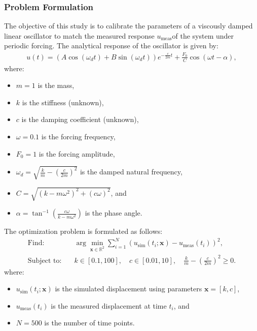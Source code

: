 \documentclass[12pt]{article}
\begin{document}
\subsubsection{Problem Formulation}
The objective of this study is to calibrate the parameters of a viscously damped linear oscillator to match the measured response $u_\text{meas}$of the system under periodic forcing. The analytical response of the oscillator is given by:
\begin{align*}
    u(t) = \left(A \cos(\omega_d t) + B \sin(\omega_d t)\right) e^{-\frac{c}{2m}t} + \frac{F_0}{C} \cos(\omega t - \alpha),
\end{align*}
where:
\begin{itemize}
    \item $m = 1$ is the mass,
    \item $k$ is the stiffness (unknown),
    \item $c$ is the damping coefficient (unknown),
    \item $\omega=0.1$ is the forcing frequency,
    \item $F_0=1$ is the forcing amplitude,
    \item $\omega_d = \sqrt{\frac{k}{m} - \left(\frac{c}{2m}\right)^2}$ is the damped natural frequency,
    \item $C = \sqrt{(k - m\omega^2)^2 + (c\omega)^2}$, and
    \item $\alpha = \tan^{-1}\left(\frac{c\omega}{k - m\omega^2}\right)$ is the phase angle.
\end{itemize}

The optimization problem is formulated as follows:
\begin{align*}
    \text{Find:} & \quad \arg \min_{\mathbf{x} \in \mathbb{R}^{2}}  \sum_{i=1}^N \left(u_{\text{sim}}(t_i; \mathbf{x}) - u_{\text{meas}}(t_i)\right)^2, \\
    \text{Subject to:} & \quad k \in [0.1, 100], \quad c \in [0.01, 10], \quad \frac{k}{m} - \left(\frac{c}{2m}\right)^2 \geq 0.
\end{align*}
where:
\begin{itemize}
    \item $u_{\text{sim}}(t_i; \mathbf{x})$ is the simulated displacement using parameters $\mathbf{x} = [k, c]$,
    \item $u_{\text{meas}}(t_i)$ is the measured displacement at time $t_i$, and
    \item $N=500$ is the number of time points.
\end{itemize}
\end{document}
